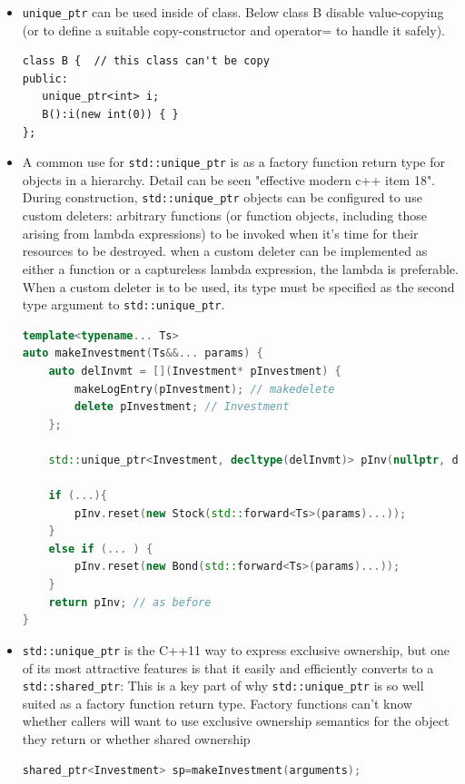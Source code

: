 \documentclass[a4paper,11pt,twoside]{book}
\begin{document}
\begin{itemize}
    \item \texttt{unique\_ptr} can be used inside of class. Below class B disable value-copying (or to define a suitable copy-constructor  and operator= to handle it safely).
\begin{lstlisting}[numbers=none]
class B {  // this class can't be copy
public:
   unique_ptr<int> i;
   B():i(new int(0)) { }
};
\end{lstlisting}

    \item A common use for \texttt{std::unique\_ptr} is as a factory function return type for objects
in a hierarchy. Detail can be seen "effective modern c++ item 18". During construction, \texttt{std::unique\_ptr} objects can be configured to use custom deleters: arbitrary functions (or function objects, including those arising from lambda expressions) to be invoked when it's time for their resources to be destroyed. when a custom deleter can be implemented as either a function or a captureless lambda expression, the lambda is preferable. When a custom deleter is to be used, its type must be specified as the second type argument to \texttt{std::unique\_ptr}.

\begin{lstlisting}[frame=single, language=c++, mathescape=true]
template<typename... Ts>
auto makeInvestment(Ts&&... params) {
	auto delInvmt = [](Investment* pInvestment) {
		makeLogEntry(pInvestment); // makedelete
		delete pInvestment; // Investment
	};

	std::unique_ptr<Investment, decltype(delInvmt)> pInv(nullptr, delInvmt);
	
	if (...){
		pInv.reset(new Stock(std::forward<Ts>(params)...));
	}
	else if (... ) {
		pInv.reset(new Bond(std::forward<Ts>(params)...));
	}
	return pInv; // as before
}
\end{lstlisting}

    \item \texttt{std::unique\_ptr} is the C++11 way to express exclusive ownership, but one of its most attractive features is that it easily and efficiently converts to a \texttt{std::shared\_ptr}: This is a key part of why \texttt{std::unique\_ptr} is so well suited as a factory function return type. Factory functions can't know whether callers will want to use exclusive ownership semantics for the object they return or whether shared ownership
\begin{lstlisting}[frame=single, language=c++, mathescape=true]
shared_ptr<Investment> sp=makeInvestment(arguments); 
\end{lstlisting}



\end{itemize}
\end{document}
